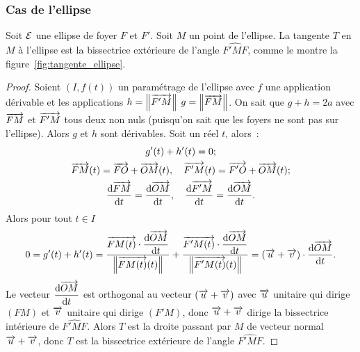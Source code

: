 \subsubsection{Cas de l'ellipse}
\begin{prop}
  Soit \(\mathcal{E}\) une ellipse de foyer \(F\) et \(F'\). Soit \(M\) un point de l'ellipse. La tangente \(T\) en \(M\) à l'ellipse est la bissectrice extérieure de l'angle \(\widehat{F'MF}\), comme le montre la figure~\ref{fig:tangente_ellipse}.
\end{prop}
\begin{proof}
  Soient \((I,f(t))\) un paramétrage de l'ellipse avec \(f\) une application dérivable et les applications \(h=\left\lVert\overrightarrow{F'M}\right\rVert\) \(g=\left\lVert\overrightarrow{FM}\right\rVert\). On sait que \(g+h=2a\) avec \(\overrightarrow{FM}\) et \(\overrightarrow{F'M}\) tous deux non nuls (puisqu'on sait que les foyers ne sont pas sur l'ellipse). Alors \(g\) et \(h\) sont dérivables. Soit un réel \(t\), alors~:
\begin{gather}
  g'(t)+h'(t)=0; \\
  \overrightarrow{FM}(t)=\overrightarrow{FO}+\overrightarrow{OM}(t), \quad \overrightarrow{F'M}(t)=\overrightarrow{F'O}+\overrightarrow{OM}(t);\\
  \dfrac{\mathrm{d} \overrightarrow{FM}}{\mathrm{d} t}=\dfrac{\mathrm{d} \overrightarrow{OM}}{\mathrm{d} t}, \quad \dfrac{\mathrm{d} \overrightarrow{F'M}}{\mathrm{d} t}=\dfrac{\mathrm{d} \overrightarrow{OM}}{\mathrm{d} t}.
\end{gather}
  Alors pour tout \(t \in I\)
  \begin{equation}
    0=g'(t)+h'(t)=\frac{\overrightarrow{FM(t)}\cdot\dfrac{\mathrm{d} \overrightarrow{OM}}{\mathrm{d} t}}{\left\lVert\overrightarrow{FM(t)}(t)\right\rVert} + \frac{\overrightarrow{F'M(t)}\cdot\dfrac{\mathrm{d} \overrightarrow{OM}}{\mathrm{d} t}}{\left\lVert\overrightarrow{F'M(t)}(t)\right\rVert}=(\overrightarrow{u}+\overrightarrow{v})\cdot \dfrac{\mathrm{d} \overrightarrow{OM}}{\mathrm{d} t}.
  \end{equation}
Le vecteur \(\dfrac{\mathrm{d} \overrightarrow{OM}}{\mathrm{d} t}\) est orthogonal au vecteur \((\overrightarrow{u}+\overrightarrow{v})\) avec \(\overrightarrow{u}\) unitaire qui dirige \((FM)\) et \(\overrightarrow{v}\) unitaire qui dirige \((F'M)\), donc \(\overrightarrow{u}+\overrightarrow{v}\) dirige la bissectrice intérieure de \(\widehat{F'MF}\). Alors \(T\) est la droite passant par \(M\) de vecteur normal \(\overrightarrow{u}+\overrightarrow{v}\), donc \(T\) est la bissectrice extérieure de l'angle \(\widehat{F'MF}\).
\end{proof}

